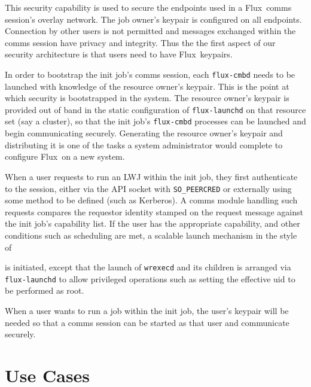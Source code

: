 \documentclass[10pt]{article}
\newcommand{\flux}{Flux}
\begin{document}
This security capability is used to secure the endpoints
used in a \flux\ comms session's overlay network.  The job owner's
keypair is configured on all endpoints.  Connection by other users
is not permitted and messages exchanged within the comms session have
privacy and integrity.  Thus the the first aspect of our security
architecture is that users need to have \flux\ keypairs.

In order to bootstrap the init job's comms session, each {\tt flux-cmbd}
needs to be launched with knowledge of the resource owner's keypair.
This is the point at which security is bootstrapped in the system.
The resource owner's keypair is provided out of band in the
static configuration of {\tt flux-launchd} on that resource set
(say a cluster), so that the init job's {\tt flux-cmbd} processes can be
launched and begin communicating securely.  Generating the resource
owner's keypair and distributing it is one of the tasks a
system administrator would complete to configure \flux\ on a new system.

When a user requests to run an LWJ within the init job, they first
authenticate to the session, either via the API socket with {\tt SO\_PEERCRED}
or externally using some method to be defined (such as Kerberos).
A comms module handling such requests compares the requestor identity
stamped on the request message against the init job's capability list.
If the user has the appropriate capability, and other conditions such as
scheduling are met, a scalable launch mechanism in the style of

is initiated, except that the launch of {\tt wrexecd} and its children
is arranged via {\tt flux-launchd} to allow privileged operations such as
setting the effective uid to be performed as root.

When a user wants to run a job within the init job, the user's keypair
will be needed so that a comms session can be started as that user and
communicate securely.

\section{Use Cases}
\label{sec:usecases}

\cite{Flux}



\end{document}
